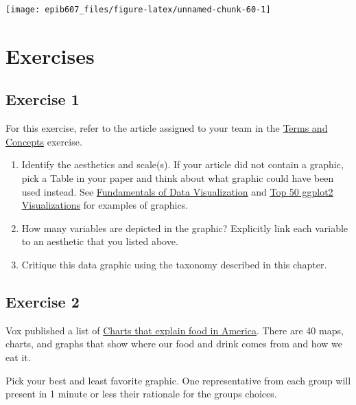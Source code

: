 \documentclass[]{book}
\providecommand{\tightlist}{%
  \setlength{\itemsep}{0pt}\setlength{\parskip}{0pt}}
\providecommand{\tightlist}{%
  \setlength{\itemsep}{0pt}\setlength{\parskip}{0pt}}
\theoremstyle{definition}
\theoremstyle{definition}
\theoremstyle{definition}
\theoremstyle{remark}
\begin{document}
\begin{center}\texttt{[image: epib607\_files/figure-latex/unnamed-chunk-60-1]} \end{center}

\section{Exercises}\label{exercises}

\subsection{Exercise 1}\label{exercise-1}

For this exercise, refer to the article assigned to your team in the
\href{https://sahirbhatnagar.com/EPIB607/terms-and-concepts.html}{Terms
and Concepts} exercise.

\begin{enumerate}
\def\labelenumi{\arabic{enumi}.}
\tightlist
\item
  Identify the aesthetics and scale(s). If your article did not contain
  a graphic, pick a Table in your paper and think about what graphic
  could have been used instead. See
  \href{https://serialmentor.com/dataviz/directory-of-visualizations.html}{Fundamentals
  of Data Visualization} and
  \href{http://r-statistics.co/Top50-Ggplot2-Visualizations-MasterList-R-Code.html\#1.\%20Correlation}{Top
  50 ggplot2 Visualizations} for examples of graphics.
\item
  How many variables are depicted in the graphic? Explicitly link each
  variable to an aesthetic that you listed above.
\item
  Critique this data graphic using the taxonomy described in this
  chapter.
\end{enumerate}

\subsection{Exercise 2}\label{exercise-2}

Vox published a list of
\href{http://www.vox.com/a/explain-food-america}{Charts that explain
food in America}. There are 40 maps, charts, and graphs that show where
our food and drink comes from and how we eat it.

Pick your best and least favorite graphic. One representative from each
group will present in 1 minute or less their rationale for the groups
choices.

\appendix
\end{document}
